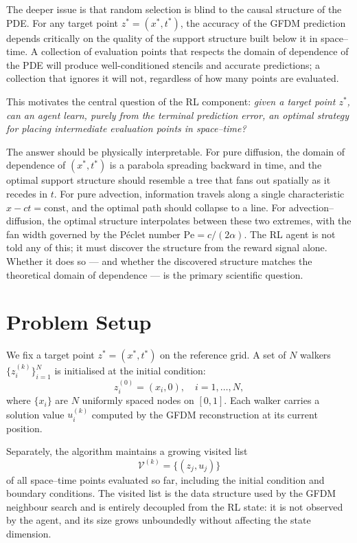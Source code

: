 \documentclass[12pt, a4paper, twoside]{report}
\theoremstyle{plain}
\theoremstyle{definition}
\begin{document}
The deeper issue is that random selection is blind to the causal structure of the PDE.
For any target point $z^* = (x^*, t^*)$, the accuracy of the GFDM prediction depends
critically on the quality of the support structure built below it in space--time. A
collection of evaluation points that respects the domain of dependence of the PDE will
produce well-conditioned stencils and accurate predictions; a collection that ignores it
will not, regardless of how many points are evaluated.

This motivates the central question of the RL component: \emph{given a target point
$z^*$, can an agent learn, purely from the terminal prediction error, an optimal strategy
for placing intermediate evaluation points in space--time?}

The answer should be physically interpretable. For pure diffusion, the domain of
dependence of $(x^*, t^*)$ is a parabola spreading backward in time, and the optimal
support structure should resemble a tree that fans out spatially as it recedes in $t$. For
pure advection, information travels along a single characteristic $x - ct = \mathrm{const}$,
and the optimal path should collapse to a line. For advection--diffusion, the optimal
structure interpolates between these two extremes, with the fan width governed by the
P\'{e}clet number $\mathrm{Pe} = c / (2\alpha)$. The RL agent is not told any of this; it
must discover the structure from the reward signal alone. Whether it does so --- and
whether the discovered structure matches the theoretical domain of dependence --- is the
primary scientific question.

\section{Problem Setup}

We fix a target point $z^* = (x^*, t^*)$ on the reference grid. A set of $N$ walkers
$\{z_i^{(k)}\}_{i=1}^N$ is initialised at the initial condition:
\begin{equation}
    z_i^{(0)} = (x_i, 0), \quad i = 1, \ldots, N,
\end{equation}
where $\{x_i\}$ are $N$ uniformly spaced nodes on $[0, 1]$. Each walker carries a
solution value $u_i^{(k)}$ computed by the GFDM reconstruction at its current position.

Separately, the algorithm maintains a growing visited list
\begin{equation}
    \mathcal{V}^{(k)} = \{(z_j, u_j)\}
\end{equation}
of all space--time points evaluated so far, including the initial condition and boundary
conditions. The visited list is the data structure used by the GFDM neighbour search and
is entirely decoupled from the RL state: it is not observed by the agent, and its size
grows unboundedly without affecting the state dimension.
\end{document}
